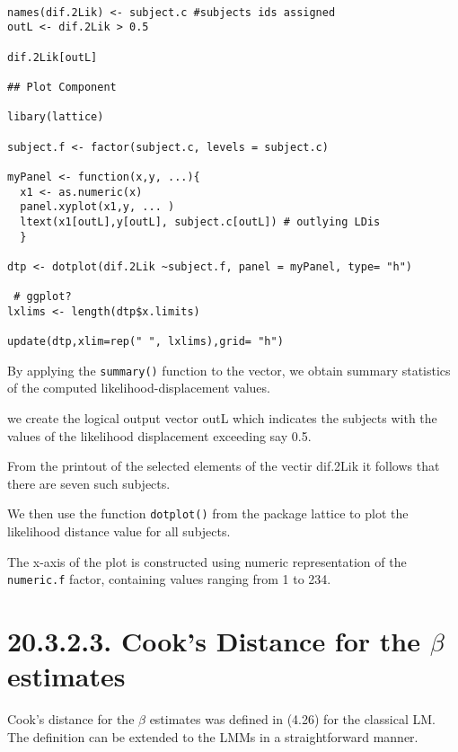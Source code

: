 \documentclass[a4paper,12pt]{article}
\begin{document}
\begin{framed}
\begin{verbatim}

names(dif.2Lik) <- subject.c #subjects ids assigned
outL <- dif.2Lik > 0.5

dif.2Lik[outL]

## Plot Component

libary(lattice)

subject.f <- factor(subject.c, levels = subject.c)

myPanel <- function(x,y, ...){
  x1 <- as.numeric(x)
  panel.xyplot(x1,y, ... )
  ltext(x1[outL],y[outL], subject.c[outL]) # outlying LDis
  }

dtp <- dotplot(dif.2Lik ~subject.f, panel = myPanel, type= "h")

 # ggplot?
lxlims <- length(dtp$x.limits)

update(dtp,xlim=rep(" ", lxlims),grid= "h")
\end{verbatim}
\end{framed}


By applying the \texttt{summary()} function to the vector, we obtain summary statistics of the computed likelihood-displacement values.

we create the logical output vector outL which indicates the subjects with the values of the 
likelihood displacement exceeding say 0.5.

From the printout of the selected elements of the vectir dif.2Lik it follows that there are
seven such subjects.


We then use the function \texttt{dotplot()} from the package lattice to plot the 
likelihood distance value for all subjects.

The x-axis of the plot is constructed using numeric representation of the \texttt{numeric.f} factor, containing values ranging from 1 to 234.
\section{20.3.2.3. Cook's Distance for the $\beta$ estimates}

Cook's distance for the $\beta$ estimates was defined in (4.26) for the classical LM.
The definition can be extended to the LMMs in a straightforward manner.

\end{document}
